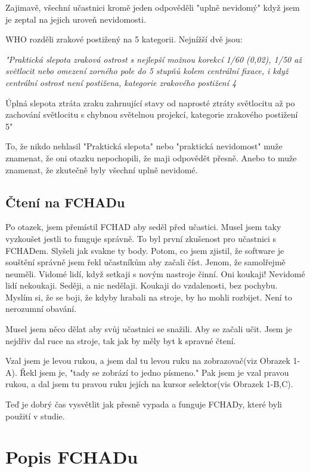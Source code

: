 Zajimavě, všechní učastnici kromě jeden odpověděli "uplně nevidomý" když jsem je zeptal na jejich uroveň nevidomosti.

WHO rozděli zrakové postižený na 5 kategorii. Nejnížší dvě jsou:

\em "Praktická slepota
zraková ostrost s nejlepší možnou korekcí 1/60 (0,02), 1/50 až světlocit nebo omezení zorného pole do 5 stupňů kolem centrální fixace, i když centrální ostrost není postižena, kategorie zrakového postižení 4

Úplná slepota ztráta zraku zahrnující stavy od naprosté ztráty světlocitu až po zachování světlocitu s chybnou světelnou projekcí, kategorie zrakového postižení 5" \em \citep{sonsklasifikace}

To, že nikdo nehlasil "Praktická slepota" nebo "praktická nevidomost" muže znamenat, že oni otazku nepochopili, že maji odpovědět přesně.  Anebo to muže znamenat, že zkutečně byly všechní uplně nevidomé.

\subsection{Čtení na FCHADu}

Po otazek, jsem přemístil FCHAD aby seděl před učastici.  Musel jsem taky vyzkoušet jestli to funguje správně. To byl první zkušenost pro učastnici s FCHADem.  Slyšeli jak svakne ty body.  Potom, co jsem zjistil, že software je souštění správně jsem řekl učastníkům aby začali číst.  Jenom, že samolřejmě neuměli.  Vidomé lidí, když setkaji s novým nastroje činní. Oni koukaji!  Nevidomé lidí nekoukaji.  Seději, a nic nedělaji.  Koukaji do vzdalenosti, bez pochybu.  Myslím si, že se boji, že kdyby hrabali na stroje, by ho mohli rozbijet.  Není to nerozumní obavání.

Musel jsem něco dělat aby svůj učastnici se snažili. Aby se začali učit.  Jsem je nejdřiv dal ruce na stroje, tak jak by měly byt k spravné čtení.

Vzal jsem je levou rukou, a jsem dal tu levou ruku na zobrazovač(viz Obrazek 1-A). Řekl jsem je, "tady se zobrází to jedno písmeno."  Pak jsem je vzal pravou rukou, a dal jsem tu pravou ruku jejích na kursor selektor(vis Obrazek 1-B,C).

Teď je dobrý čas vysvětlit jak přesně vypada a funguje FCHADy, které byli použití v studie.

\section{Popis FCHADu}

